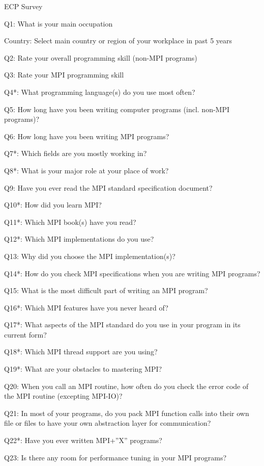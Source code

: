 
ECP Survey\cite{osti_1462877}

\begin{description}
\item{Q1:} What is your main occupation
\item{Country:} Select main country or region of your workplace in past 5 years
\item{Q2:} Rate your overall programming skill (non-MPI programs)
\item{Q3:} Rate your MPI programming skill
\item{Q4*:} What programming language(s) do you use most often?
\item{Q5:} How long have you been writing computer programs (incl. non-MPI programs)?
\item{Q6:} How long have you been writing MPI programs?
\item{Q7*:} Which fields are you mostly working in?
\item{Q8*:} What is your major role at your place of work?
\item{Q9:} Have you ever read the MPI standard specification document?
\item{Q10*:} How did you learn MPI?
\item{Q11*:} Which MPI book(s) have you read?
\item{Q12*:} Which MPI implementations do you use?
\item{Q13:} Why did you choose the MPI implementation(s)?
\item{Q14*:} How do you check MPI specifications when you are writing MPI programs?
\item{Q15:} What is the most difficult part of writing an MPI program?
\item{Q16*:} Which MPI features have you never heard of?
\item{Q17*:} What aspects of the MPI standard do you use in your program in its current form?
\item{Q18*:} Which MPI thread support are you using?
\item{Q19*:} What are your obstacles to mastering MPI?
\item{Q20:} When you call an MPI routine, how often do you check the error code of the MPI routine  (excepting MPI-IO)?
\item{Q21:} In most of your programs, do you pack MPI function calls into their own file or files to have your own abstraction layer for communication?
\item{Q22*:} Have you ever written MPI+”X” programs?
\item{Q23:} Is there any room for performance tuning in your MPI programs?

\end{description}
